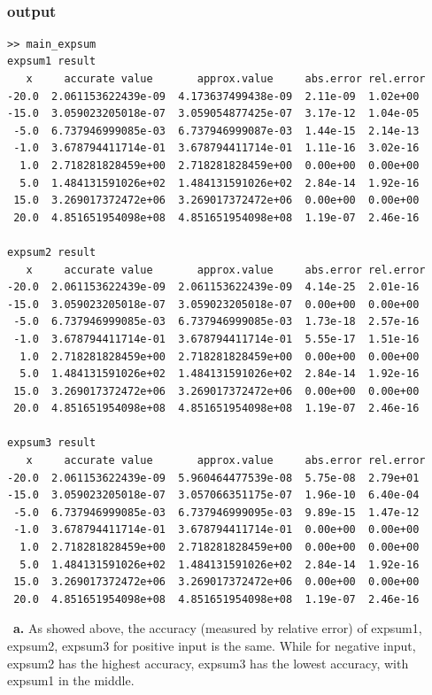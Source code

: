 \documentclass[11pt,fleqn]{exam}
\newcommand{\nn}{~\newline \noindent }
\begin{document}
	\nn
	\subsubsection*{output}
	\begin{lstlisting}
>> main_expsum
expsum1 result
   x     accurate value       approx.value     abs.error rel.error
-20.0  2.061153622439e-09  4.173637499438e-09  2.11e-09  1.02e+00 
-15.0  3.059023205018e-07  3.059054877425e-07  3.17e-12  1.04e-05 
 -5.0  6.737946999085e-03  6.737946999087e-03  1.44e-15  2.14e-13 
 -1.0  3.678794411714e-01  3.678794411714e-01  1.11e-16  3.02e-16 
  1.0  2.718281828459e+00  2.718281828459e+00  0.00e+00  0.00e+00 
  5.0  1.484131591026e+02  1.484131591026e+02  2.84e-14  1.92e-16 
 15.0  3.269017372472e+06  3.269017372472e+06  0.00e+00  0.00e+00 
 20.0  4.851651954098e+08  4.851651954098e+08  1.19e-07  2.46e-16 

expsum2 result
   x     accurate value       approx.value     abs.error rel.error
-20.0  2.061153622439e-09  2.061153622439e-09  4.14e-25  2.01e-16 
-15.0  3.059023205018e-07  3.059023205018e-07  0.00e+00  0.00e+00 
 -5.0  6.737946999085e-03  6.737946999085e-03  1.73e-18  2.57e-16 
 -1.0  3.678794411714e-01  3.678794411714e-01  5.55e-17  1.51e-16 
  1.0  2.718281828459e+00  2.718281828459e+00  0.00e+00  0.00e+00 
  5.0  1.484131591026e+02  1.484131591026e+02  2.84e-14  1.92e-16 
 15.0  3.269017372472e+06  3.269017372472e+06  0.00e+00  0.00e+00 
 20.0  4.851651954098e+08  4.851651954098e+08  1.19e-07  2.46e-16 

expsum3 result
   x     accurate value       approx.value     abs.error rel.error
-20.0  2.061153622439e-09  5.960464477539e-08  5.75e-08  2.79e+01 
-15.0  3.059023205018e-07  3.057066351175e-07  1.96e-10  6.40e-04 
 -5.0  6.737946999085e-03  6.737946999095e-03  9.89e-15  1.47e-12 
 -1.0  3.678794411714e-01  3.678794411714e-01  0.00e+00  0.00e+00 
  1.0  2.718281828459e+00  2.718281828459e+00  0.00e+00  0.00e+00 
  5.0  1.484131591026e+02  1.484131591026e+02  2.84e-14  1.92e-16 
 15.0  3.269017372472e+06  3.269017372472e+06  0.00e+00  0.00e+00 
 20.0  4.851651954098e+08  4.851651954098e+08  1.19e-07  2.46e-16 

	\end{lstlisting}


\nn \textbf{a.} As showed above, the accuracy (measured by relative error) of expsum1, expsum2, expsum3 for positive input is the same. While for negative input, expsum2 has the highest accuracy, expsum3 has the lowest accuracy, with expsum1 in the middle.  
\end{document}
